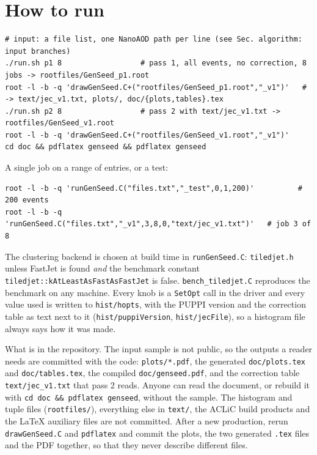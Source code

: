 \section{How to run}
\label{s:howto}

\begin{lstlisting}
# input: a file list, one NanoAOD path per line (see Sec. algorithm: input branches)
./run.sh p1 8                  # pass 1, all events, no correction, 8 jobs -> rootfiles/GenSeed_p1.root
root -l -b -q 'drawGenSeed.C+("rootfiles/GenSeed_p1.root","_v1")'   # -> text/jec_v1.txt, plots/, doc/{plots,tables}.tex
./run.sh p2 8                  # pass 2 with text/jec_v1.txt -> rootfiles/GenSeed_v1.root
root -l -b -q 'drawGenSeed.C+("rootfiles/GenSeed_v1.root","_v1")'
cd doc && pdflatex genseed && pdflatex genseed
\end{lstlisting}

\noindent A single job on a range of entries, or a test:
\begin{lstlisting}
root -l -b -q 'runGenSeed.C("files.txt","_test",0,1,200)'          # 200 events
root -l -b -q 'runGenSeed.C("files.txt","_v1",3,8,0,"text/jec_v1.txt")'   # job 3 of 8
\end{lstlisting}

\noindent The clustering backend is chosen at build time in \texttt{runGenSeed.C}:
\texttt{tiledjet.h} unless FastJet is found \emph{and} the benchmark constant
\texttt{tiledjet::kAtLeastAsFastAsFastJet} is false. \texttt{bench\_tiledjet.C}
reproduces the benchmark on any machine. Every knob is a \texttt{SetOpt} call
in the driver and every value used is written to \texttt{hist/hopts}, with the
PUPPI version and the correction table as text next to it
(\texttt{hist/puppiVersion}, \texttt{hist/jecFile}), so a histogram file
always says how it was made.

\noindent What is in the repository. The input sample is not public, so the
outputs a reader needs are committed with the code: \texttt{plots/*.pdf},
the generated \texttt{doc/plots.tex} and \texttt{doc/tables.tex}, the
compiled \texttt{doc/genseed.pdf}, and the correction table
\texttt{text/jec\_v1.txt} that pass 2 reads. Anyone can read the document, or
rebuild it with \texttt{cd doc \&\& pdflatex genseed}, without the sample.
The histogram and tuple files (\texttt{rootfiles/}), everything else in
\texttt{text/}, the ACLiC build products and the \LaTeX{} auxiliary files are
not committed. After a new production, rerun \texttt{drawGenSeed.C} and
\texttt{pdflatex} and commit the plots, the two generated \texttt{.tex} files
and the PDF together, so that they never describe different files.

